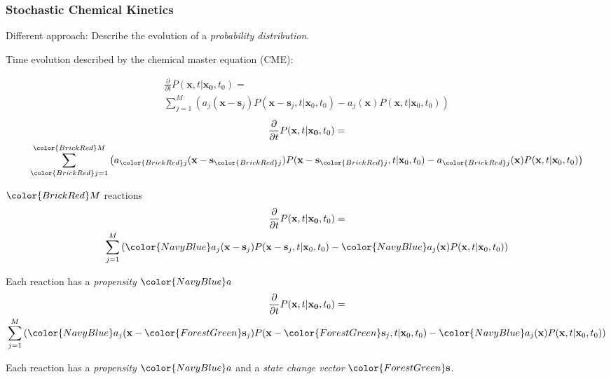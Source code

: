 \documentclass[xcolor={usenames,dvipsnames,svgnames}]{beamer}
\renewcommand{\vec}[1]{\ensuremath{\mathbf{#1}}}
\begin{document}
\begin{frame}
    \frametitle{Stochastic Chemical Kinetics}
    Different approach: Describe the evolution of a \emph{probability distribution}.
    \pause
    
    Time evolution described by the chemical master equation (CME):
    \begin{overprint}
        \begin{multline*}
            \frac{\partial}{\partial t} P(\vec{x}, t | \vec{x_0}, t_0) = \\
            \sum_{j=1}^{M} \left( a_j(\vec{x} - \vec{s}_j) P(\vec{x} - \vec{s}_j, t | \vec{x}_0, t_0) - a_j(\vec{x}) P(\vec{x}, t | \vec{x}_0, t_0) \right)
        \end{multline*} 
        \begin{multline*}
            \frac{\partial}{\partial t} P(\vec{x}, t | \vec{x_0}, t_0) = \\
            \sum_{{\color{BrickRed} j}=1}^{ {\color{BrickRed} M} } \left( a_{\color{BrickRed} j}(\vec{x} - \vec{s}_{\color{BrickRed} j}) P(\vec{x} - \vec{s}_{\color{BrickRed} j}, t | \vec{x}_0, t_0) - a_{\color{BrickRed} j}(\vec{x}) P(\vec{x}, t | \vec{x}_0, t_0) \right)
        \end{multline*} 

        $\color{BrickRed} M$ reactions
        \begin{multline*}
            \frac{\partial}{\partial t} P(\vec{x}, t | \vec{x_0}, t_0) = \\
            \sum_{j=1}^{M} \left( {\color{NavyBlue} a_j}(\vec{x} - \vec{s}_j) P(\vec{x} - \vec{s}_j, t | \vec{x}_0, t_0) - {\color{NavyBlue}a_j}(\vec{x}) P(\vec{x}, t | \vec{x}_0, t_0) \right)
        \end{multline*} 

        Each reaction has a \emph{propensity} $\color{NavyBlue} a$
        \begin{multline*}
            \frac{\partial}{\partial t} P(\vec{x}, t | \vec{x_0}, t_0) = \\
            \sum_{j=1}^{M} \left( {\color{NavyBlue} a_j}(\vec{x} - {\color{ForestGreen} \vec{s}_j}) P(\vec{x} - {\color{ForestGreen} \vec{s}_j}, t | \vec{x}_0, t_0) - {\color{NavyBlue}a_j}(\vec{x}) P(\vec{x}, t | \vec{x}_0, t_0) \right)
        \end{multline*} 

        Each reaction has a \emph{propensity} $\color{NavyBlue} a$ and a \emph{state change vector} $\color{ForestGreen} \vec{s}$.
    \end{overprint}
\end{frame}
\end{document}
